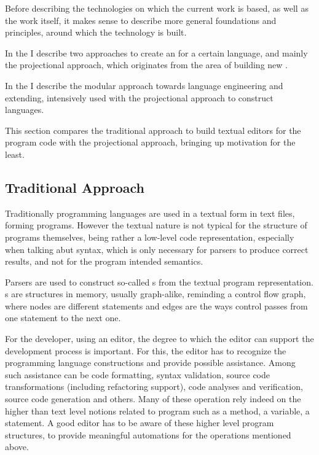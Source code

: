 
Before describing the technologies on which the current work is based, as well as the work itself,
it makes sense to describe more general foundations and principles, around which the technology is built.

In the  I describe two approaches to create an  for a certain language, and mainly the 
projectional approach, which originates from the area of building new .

In the  I describe the modular approach towards language engineering and extending, intensively
used with the projectional approach to construct languages.



This section compares the traditional approach to build textual editors for the program code with
the projectional approach, bringing up  motivation for the least.

\subsection{Traditional Approach}
Traditionally programming languages are used in a textual form in text files, forming programs.
However the textual nature is not typical for the structure of programs themselves, being rather a low-level code representation, especially when talking abut syntax, which is only necessary for 
parsers to produce correct results, and not for the program intended semantics.


Parsers are used to construct so-called s from the textual 
program representation. s are structures in memory, usually graph-alike, 
reminding a control flow graph, where nodes are different statements and edges are 
the ways control passes from one statement to the next one.

For the developer, using an editor, the degree to which the editor can support the development
process is important. For this, the editor has to recognize the programming language constructions and provide possible assistance. Among such assistance can be code formatting, syntax validation,
source code transformations (including refactoring support), code analyses and verification, 
source code generation and others. Many of these operation rely indeed on the higher than text level notions related to program such as a method, a variable, a statement. 
A good editor has to be aware of these higher level program structures, to provide meaningful automations for the operations mentioned above.

